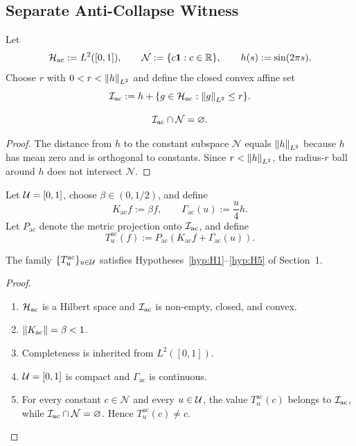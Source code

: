 \subsection{Separate Anti-Collapse Witness}

\begin{definition}
Let
\[
\mathcal{H}_{\mathrm{ac}}:=L^2([0,1]),
\qquad
\mathcal{N}:=\{c\mathbf{1}:c\in\mathbb{R}\},
\qquad
h(s):=\sin(2\pi s).
\]
Choose $r$ with $0<r<\left\lVert h \right\rVert_{L^2}$ and define the closed convex affine set
\[
\mathcal{I}_{\mathrm{ac}}:=h+\{g\in\mathcal{H}_{\mathrm{ac}}:\left\lVert g \right\rVert_{L^2}\le r\}.
\]
\end{definition}

\begin{lemma}
\[
\mathcal{I}_{\mathrm{ac}}\cap \mathcal{N}=\varnothing.
\]
\end{lemma}

\begin{proof}
The distance from $h$ to the constant subspace $\mathcal{N}$ equals $\left\lVert h \right\rVert_{L^2}$ because $h$ has mean zero and is orthogonal to constants. Since $r<\left\lVert h \right\rVert_{L^2}$, the radius-$r$ ball around $h$ does not intersect $\mathcal{N}$.
\end{proof}

\begin{definition}
Let $\mathcal{U}=[0,1]$, choose $\beta\in(0,1/2)$, and define
\[
K_{\mathrm{ac}}f:=\beta f,
\qquad
\Gamma_{\mathrm{ac}}(u):=\frac{u}{4}h.
\]
Let $P_{\mathrm{ac}}$ denote the metric projection onto $\mathcal{I}_{\mathrm{ac}}$, and define
\[
T_u^{\mathrm{ac}}(f):=P_{\mathrm{ac}}(K_{\mathrm{ac}}f+\Gamma_{\mathrm{ac}}(u)).
\]
\end{definition}

\begin{proposition}
The family $\{T_u^{\mathrm{ac}}\}_{u\in\mathcal{U}}$ satisfies Hypotheses~\ref{hyp:H1}--\ref{hyp:H5} of Section~1.
\end{proposition}

\begin{proof}
\begin{enumerate}[leftmargin=*]
\item $\mathcal{H}_{\mathrm{ac}}$ is a Hilbert space and $\mathcal{I}_{\mathrm{ac}}$ is non-empty, closed, and convex.
\item $\left\lVert K_{\mathrm{ac}} \right\rVert=\beta<1$.
\item Completeness is inherited from $L^2([0,1])$.
\item $\mathcal{U}=[0,1]$ is compact and $\Gamma_{\mathrm{ac}}$ is continuous.
\item For every constant $c\in\mathcal{N}$ and every $u\in\mathcal{U}$, the value $T_u^{\mathrm{ac}}(c)$ belongs to $\mathcal{I}_{\mathrm{ac}}$, while $\mathcal{I}_{\mathrm{ac}}\cap\mathcal{N}=\varnothing$. Hence $T_u^{\mathrm{ac}}(c)\neq c$.
\end{enumerate}
\end{proof}

